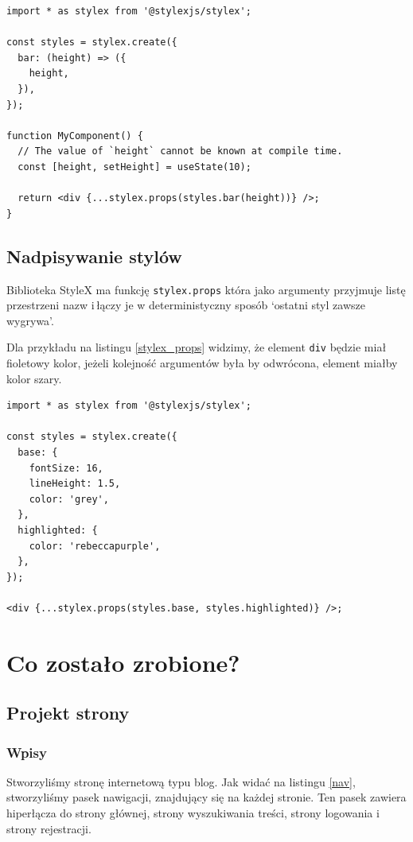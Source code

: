 \documentclass[a4paper,12pt]{book} %
\begin{document}
\begin{lstfloat}[hb]
  \lstset{language=HTML}
  \begin{lstlisting}[frame=single]
import * as stylex from '@stylexjs/stylex';

const styles = stylex.create({
  bar: (height) => ({
    height,
  }),
});

function MyComponent() {
  // The value of `height` cannot be known at compile time.
  const [height, setHeight] = useState(10);

  return <div {...stylex.props(styles.bar(height))} />;
}
\end{lstlisting}
  \caption{Przykład użycia zmiennych CSS}\label{stylex_css}
\end{lstfloat}
\clearpage
\section{Nadpisywanie stylów}
Biblioteka StyleX ma funkcję \lstinline|stylex.props| która jako argumenty przyjmuje listę przestrzeni nazw i\,łączy je w deterministyczny sposób `ostatni styl zawsze wygrywa'.

Dla przykładu na listingu \ref{stylex_props} widzimy, że element \lstinline|div| będzie miał fioletowy kolor, jeżeli kolejność argumentów była by odwrócona, element miałby kolor szary.

\begin{lstfloat}[hb]
  \lstset{language=HTML}
  \begin{lstlisting}[frame=single]
import * as stylex from '@stylexjs/stylex';

const styles = stylex.create({
  base: {
    fontSize: 16,
    lineHeight: 1.5,
    color: 'grey',
  },
  highlighted: {
    color: 'rebeccapurple',
  },
});

<div {...stylex.props(styles.base, styles.highlighted)} />;
\end{lstlisting}
  \caption{Przykład nadpisywania stylów}\label{stylex_props}
\end{lstfloat}
\chapter{Co zostało zrobione?}

\section{Projekt strony}

\subsection{Wpisy}
Stworzyliśmy stronę internetową typu blog. Jak widać na listingu \ref{nav}, stworzyliśmy pasek nawigacji, znajdujący się na każdej stronie. Ten pasek zawiera hiperłącza do strony głównej, strony wyszukiwania treści, strony logowania i\,strony rejestracji.
\end{document}
